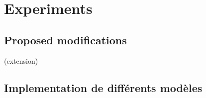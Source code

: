 \section{Experiments}

\subsection{Proposed modifications}
 (extension)
 
\subsection{Implementation de différents modèles}